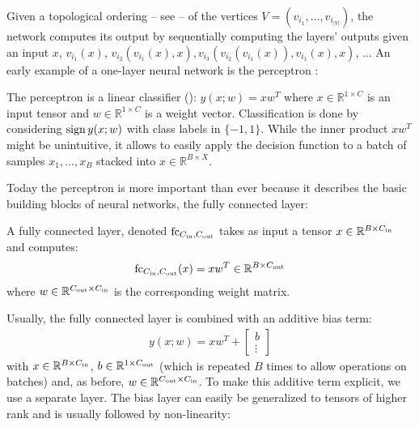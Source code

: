 Given a topological ordering -- see \cite[Chapter~22]{Cormen:2009} -- of the
vertices $V = (v_{i_1}, \ldots, v_{i_{|V|}})$, the network computes its output
by sequentially computing the layers' outputs given an input $x$, \ie
$v_{i_1}(x)$, $v_{i_2}(v_{i_1}(x), x), v_{i_3}(v_{i_2}(v_{i_1}(x)), v_{i_1}(x), x)$, ...
An early example of a one-layer neural network is the perceptron \cite{Rosenblatt:1958}:

\begin{example}
  The perceptron is a linear classifier (\cf \cite[Chapter~4]{Bishop:2006}):
  $y(x;w) = x w^T$ where $x \in \mathbb{R}^{1 \times C}$ is an input tensor and
  $w \in \mathbb{R}^{1 \times C}$
  is a weight vector. Classification is done by considering $\operatorname{sign} y(x;w)$
  with class labels in $\{-1,1\}$. While the
  inner product $x w^T$ might be unintuitive,
  it allows to easily apply the decision function
  to a batch of samples $x_1,\ldots,x_B$ stacked into $x \in \mathbb{R}^{B \times X}$.
\end{example}

Today the perceptron is more important than ever because it describes the
basic building blocks of neural networks, the fully connected layer:

\begin{definition}
  A fully connected layer, denoted $\text{fc}_{C_{\text{in}}, C_{\text{out}}}$
  takes as input a tensor $x \in \mathbb{R}^{B \times C_{\text{in}}}$ and computes:
  \begin{align}
    \text{fc}_{C_{\text{in}},C_{\text{out}}}(x) = x w^T \in \mathbb{R}^{B \times C_{\text{out}}}
  \end{align}
  where $w \in \mathbb{R}^{C_{\text{out}} \times C_{\text{in}}}$ is the corresponding weight matrix.
\end{definition}

Usually, the fully connected layer is combined with an additive bias term:
\begin{align}
  y(x;w) = x w^T + \left[\begin{matrix}b\\\vdots\end{matrix}\right]
\end{align}
with $x \in \mathbb{R}^{B \times C_{\text{in}}}$, $b \in \mathbb{R}^{1 \times C_{\text{out}}}$
(which is repeated $B$ times to allow operations on batches) and,
as before, $w \in \mathbb{R}^{C_{\text{out}} \times C_{\text{in}}}$. 
To make this additive term explicit, we use a separate layer.
The bias layer can easily be generalized to tensors of higher rank and
is usually followed by non-linearity:

